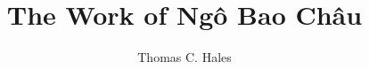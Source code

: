 \documentclass[11pt]{amsproc} %
\title{The Work of Ng\^o Bao Ch\^au}
\author{Thomas C. Hales}
\begin{document}
\maketitle



\raggedright

\end{document}
